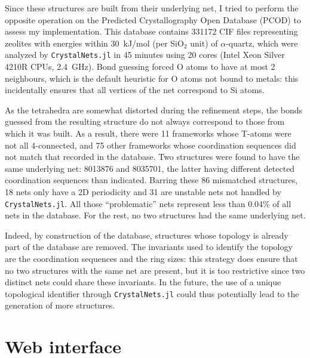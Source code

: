 \documentclass[main.tex]{subfiles}
\begin{document}
Since these structures are built from their underlying net, I tried to perform the opposite operation on the Predicted Crystallography Open Database (PCOD) \autocite{Deem} to assess my implementation. This database contains \num{331172} CIF files representing zeolites with energies within \qty{30}{kJ/mol} (per SiO$_2$ unit) of $\alpha$-quartz, which were analyzed by \texttt{CrystalNets.jl} in 45 minutes using 20 cores (Intel Xeon Silver 4210R CPUs, 2.4~GHz). Bond guessing forced O atoms to have at most 2 neighbours, which is the default heuristic for O atoms not bound to metals: this incidentally ensures that all vertices of the net correspond to Si atoms.

As the  tetrahedra are somewhat distorted during the refinement steps, the bonds guessed from the resulting structure do not always correspond to those from which it was built. As a result, there were 11 frameworks whose T-atoms were not all 4-connected, and 75 other frameworks whose coordination sequences did not match that recorded in the database. Two structures were found to have the same underlying net: 8013876 and 8035701, the latter having different detected coordination sequences than indicated.
Barring these 86 mismatched structures, 18 nets only have a 2D periodicity and 31 are unstable nets not handled by \texttt{CrystalNets.jl}. All those ``problematic'' nets represent less than 0.04\% of all nets in the database. For the rest, no two structures had the same underlying net.

Indeed, by construction of the database, structures whose topology is already part of the database are removed. The invariants used to identify the topology are the coordination sequences and the ring sizes: this strategy does ensure that no two structures with the same net are present, but it is too restrictive since two distinct nets could share these invariants. In the future, the use of a unique topological identifier through \texttt{CrystalNets.jl} could thus potentially lead to the generation of more structures.

\section{Web interface}
\label{webcrystalnets}
\end{document}
